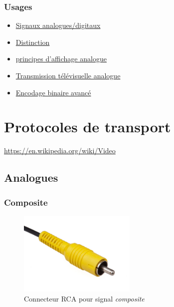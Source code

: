 \documentclass[
  french,
]{book}
\providecommand{\tightlist}{%
  \setlength{\itemsep}{0pt}\setlength{\parskip}{0pt}}
\begin{document}
\hypertarget{usages}{%
\subsubsection{Usages}\label{usages}}

\begin{itemize}
\tightlist
\item
  \href{https://en.wikipedia.org/wiki/Video\#Analog_video}{Signaux analogues/digitaux}
\item
  \href{http://what-when-how.com/display-interfaces/basics-of-analog-and-digital-display-interfaces-part-1/}{Distinction}
\item
  \href{http://what-when-how.com/display-interfaces/basic-concepts-in-display-systems-part-1/}{principes d'affichage analogue}
\item
  \href{https://en.wikipedia.org/wiki/Analog_television}{Transmission télévisuelle analogue}
\item
  \href{https://github.com/sebpiq/cours-son-reseaux/blob/main/data-encodage.md}{Encodage binaire avancé}
\end{itemize}

\hypertarget{protocoles-de-transport}{%
\section{Protocoles de transport}\label{protocoles-de-transport}}

\url{https://en.wikipedia.org/wiki/Video}

\hypertarget{analogues}{%
\subsection{Analogues}\label{analogues}}

\hypertarget{composite}{%
\subsubsection{Composite}\label{composite}}

\begin{figure}
\centering
\includegraphics[width=0.5\textwidth,height=\textheight]{medias/lexique/signaux/analogue/composite.jpg}
\caption{Connecteur RCA pour signal \emph{composite}}
\end{figure}
\end{document}

